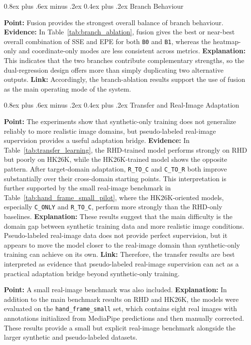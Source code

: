 \documentclass[10pt,letterpaper]{article}
\makeatletter
\renewcommand\subsubsection{\@startsection{subsubsection}{3}{\z@}%
  {0.8ex plus .6ex minus .2ex}%
  {0.4ex plus .2ex}%
  {\normalfont\small\itshape}}
\makeatother
\begin{document}
\subsubsection{Branch Behaviour}

\medskip
\noindent\textbf{Point:} Fusion provides the strongest overall balance of branch behaviour.  
\textbf{Evidence:} In Table~\ref{tab:branch_ablation}, fusion gives the best or near-best overall combination of SSE and EPE for both \texttt{B0} and \texttt{B1}, whereas the heatmap-only and coordinate-only modes are less consistent across metrics.  
\textbf{Explanation:} This indicates that the two branches contribute complementary strengths, so the dual-regression design offers more than simply duplicating two alternative outputs.  
\textbf{Link:} Accordingly, the branch-ablation results support the use of fusion as the main operating mode of the system.

\subsubsection{Transfer and Real-Image Adaptation}

\medskip
\noindent\textbf{Point:} The experiments show that synthetic-only training does not generalize reliably to more realistic image domains, but pseudo-labeled real-image supervision provides a useful adaptation bridge.  
\textbf{Evidence:} In Table~\ref{tab:transfer_learning}, the RHD-trained model performs strongly on RHD but poorly on HK26K, while the HK26K-trained model shows the opposite pattern. After target-domain adaptation, \texttt{R\_TO\_C} and \texttt{C\_TO\_R} both improve substantially over their cross-domain starting points. This interpretation is further supported by the small real-image benchmark in Table~\ref{tab:hand_frame_small_pilot}, where the HK26K-oriented models, especially \texttt{C\_ONLY} and \texttt{R\_TO\_C}, perform more strongly than the RHD-only baselines.  
\textbf{Explanation:} These results suggest that the main difficulty is the domain gap between synthetic training data and more realistic image conditions. Pseudo-labeled real-image data does not provide perfect supervision, but it appears to move the model closer to the real-image domain than synthetic-only training can achieve on its own.  
\textbf{Link:} Therefore, the transfer results are best interpreted as evidence that pseudo-labeled real-image supervision can act as a practical adaptation bridge beyond synthetic-only training.

\medskip
\noindent\textbf{Point:} A small real-image benchmark was also included.  
\textbf{Explanation:} In addition to the main benchmark results on RHD and HK26K, the models were evaluated on the \texttt{hand\_frame\_small} set, which contains eight real images with annotations initialized from MediaPipe predictions and then manually corrected. These results provide a small but explicit real-image benchmark alongside the larger synthetic and pseudo-labeled datasets.
\end{document}
